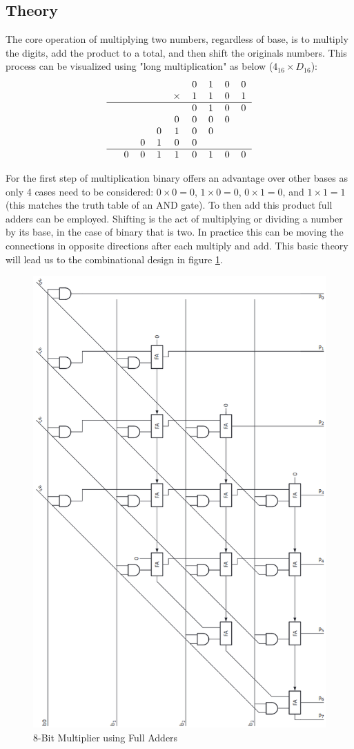 \documentclass[11pt]{article}
\begin{document}
\subsection{Theory}
The core operation of multiplying two numbers, regardless of base, is to 
multiply the digits, add the product to a total, and then shift the originals numbers\cite{dally}.
This process can be visualized using "long multiplication" as below ($4_{16} \times D_{16}$):
\begin{equation}
    \begin{tabular}{c c c c c c c c c }
                &   &   &   &   & 0 & 1 & 0 & 0 \\
                &   &   &   &  $\times$ & 1 & 1 & 0 & 1 \\
                \hline
                &   &   &   &   & 0 & 1 & 0 & 0 \\
                &   &   &   & 0 & 0 & 0 & 0 &   \\
                &   &   & 0 & 1 & 0 & 0 &   &   \\
                &   & 0 & 1 & 0 & 0 &   &   &   \\
                \hline
                & 0 & 0 & 1 & 1 & 0 & 1 & 0 & 0 \\
    \end{tabular} 
\end{equation}

For the first step of multiplication binary offers an advantage over other bases as only 4 cases need to be considered: 
$0 \times 0 = 0$, $1 \times 0 = 0$, $0 \times 1 = 0$, and $1 \times 1 = 1$ (this matches the truth table of an AND gate).
To then add this product full adders can be employed.
Shifting is the act of multiplying or dividing a number by its base, in the case of binary that is two.
In practice this can be moving the connections in opposite directions after each multiply and add. 
This basic theory will lead us to the combinational design in figure \ref{fig:mult_fa}.

\begin{figure}[H]        
    \centering
    \includegraphics[width=.5\textwidth]{MultFA.png}
    \caption{8-Bit Multiplier using Full Adders \cite{dally}}
    \label{fig:mult_fa}
\end{figure} 
\end{document}
